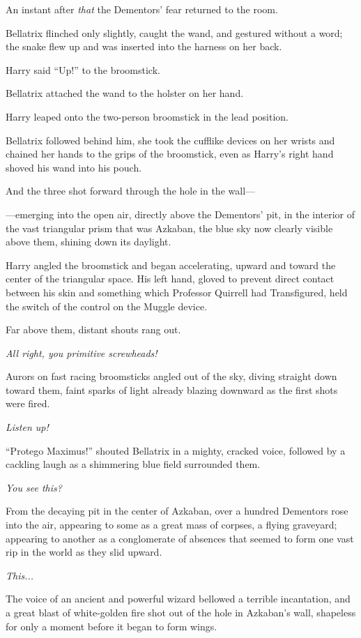 An instant after \emph{that} the Dementors’ fear returned to the room.

Bellatrix flinched only slightly, caught the wand, and gestured without a word; the snake flew up and was inserted into the harness on her back.

Harry said “Up!” to the broomstick.

Bellatrix attached the wand to the holster on her hand.

Harry leaped onto the two-person broomstick in the lead position.

Bellatrix followed behind him, she took the cufflike devices on her wrists and chained her hands to the grips of the broomstick, even as Harry’s right hand shoved his wand into his pouch.

And the three shot forward through the hole in the wall—

—emerging into the open air, directly above the Dementors’ pit, in the interior of the vast triangular prism that was Azkaban, the blue sky now clearly visible above them, shining down its daylight.

Harry angled the broomstick and began accelerating, upward and toward the center of the triangular space. His left hand, gloved to prevent direct contact between his skin and something which Professor Quirrell had Transfigured, held the switch of the control on the Muggle device.

Far above them, distant shouts rang out.

\emph{All right, you primitive screwheads!}

Aurors on fast racing broomsticks angled out of the sky, diving straight down toward them, faint sparks of light already blazing downward as the first shots were fired.

\emph{Listen up!\\}

“Protego Maximus!” shouted Bellatrix in a mighty, cracked voice, followed by a cackling laugh as a shimmering blue field surrounded them.

\emph{You see this?}

From the decaying pit in the center of Azkaban, over a hundred Dementors rose into the air, appearing to some as a great mass of corpses, a flying graveyard; appearing to another as a conglomerate of absences that seemed to form one vast rip in the world as they slid upward.

\emph{This...}

The voice of an ancient and powerful wizard bellowed a terrible incantation, and a great blast of white-golden fire shot out of the hole in Azkaban’s wall, shapeless for only a moment before it began to form wings.

